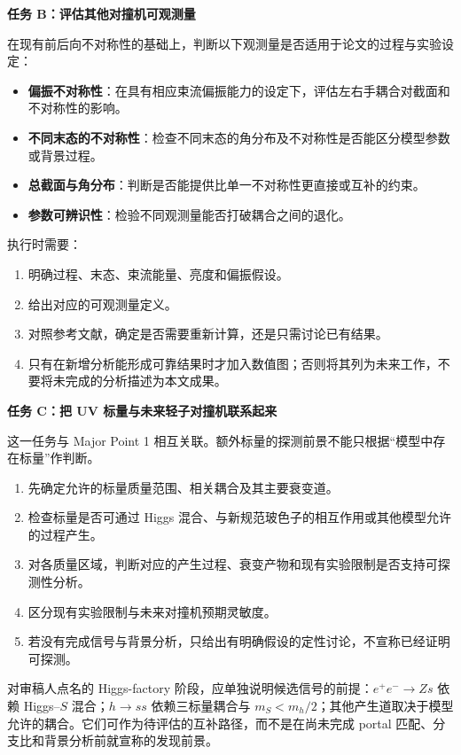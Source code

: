 \documentclass[
  chinese,
  UTF8]{ctexart}
\providecommand{\tightlist}{%
  \setlength{\itemsep}{0pt}\setlength{\parskip}{0pt}}
\begin{document}
\textbf{任务 B：评估其他对撞机可观测量}

在现有前后向不对称性的基础上，判断以下观测量是否适用于论文的过程与实验设定：

\begin{itemize}
\tightlist
\item
  \textbf{偏振不对称性}：在具有相应束流偏振能力的设定下，评估左右手耦合对截面和不对称性的影响。
\item
  \textbf{不同末态的不对称性}：检查不同末态的角分布及不对称性是否能区分模型参数或背景过程。
\item
  \textbf{总截面与角分布}：判断是否能提供比单一不对称性更直接或互补的约束。
\item
  \textbf{参数可辨识性}：检验不同观测量能否打破耦合之间的退化。
\end{itemize}

执行时需要：

\begin{enumerate}
\def\labelenumi{\arabic{enumi}.}
\tightlist
\item
  明确过程、末态、束流能量、亮度和偏振假设。
\item
  给出对应的可观测量定义。
\item
  对照参考文献，确定是否需要重新计算，还是只需讨论已有结果。
\item
  只有在新增分析能形成可靠结果时才加入数值图；否则将其列为未来工作，不要将未完成的分析描述为本文成果。
\end{enumerate}

\textbf{任务 C：把 UV 标量与未来轻子对撞机联系起来}

这一任务与 Major Point 1
相互关联。额外标量的探测前景不能只根据``模型中存在标量''作判断。

\begin{enumerate}
\def\labelenumi{\arabic{enumi}.}
\tightlist
\item
  先确定允许的标量质量范围、相关耦合及其主要衰变道。
\item
  检查标量是否可通过 Higgs
  混合、与新规范玻色子的相互作用或其他模型允许的过程产生。
\item
  对各质量区域，判断对应的产生过程、衰变产物和现有实验限制是否支持可探测性分析。
\item
  区分现有实验限制与未来对撞机预期灵敏度。
\item
  若没有完成信号与背景分析，只给出有明确假设的定性讨论，不宣称已经证明可探测。
\end{enumerate}

对审稿人点名的 Higgs-factory
阶段，应单独说明候选信号的前提：\(e^+e^-\to Zs\) 依赖 Higgs--\(S\)
混合；\(h\to ss\) 依赖三标量耦合与
\(m_S<m_h/2\)；其他产生道取决于模型允许的耦合。它们可作为待评估的互补路径，而不是在尚未完成
portal 匹配、分支比和背景分析前就宣称的发现前景。
\end{document}
